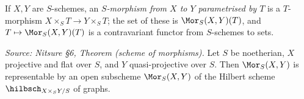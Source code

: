 If $X,Y$ are $S$-schemes, an \emph{$S$-morphism from $X$ to $Y$ parametrised by
$T$} is a $T$-morphism $X\times_S T\to Y\times_S T$; the set of these is
$\Mor_S(X,Y)(T)$, and $T\mapsto \Mor_S(X,Y)(T)$ is a contravariant functor from
$S$-schemes to sets.

\begin{theorem}
  \label{thm:scheme-of-morphisms}
  \textit{Source: Nitsure §6, Theorem (scheme of morphisms).}
  Let $S$ be noetherian, $X$ projective and flat over $S$, and $Y$
  quasi-projective over $S$. Then $\Mor_S(X,Y)$ is representable by an open
  subscheme $\Mor_S(X,Y)$ of the Hilbert scheme $\hilbsch_{X\times_S Y/S}$ of
  graphs.
\end{theorem}

